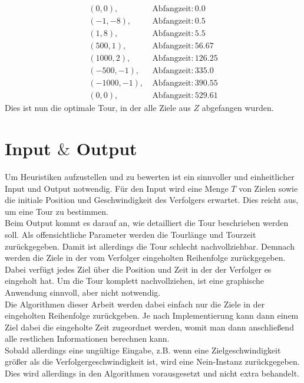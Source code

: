 \documentclass[german,version-2019-11]{uzl-thesis}
\begin{document}
\begin{example}
\begin{align*}
(0, 0),~ &\text{Abfangzeit}: 0.0 \\
(-1, -8),~ &\text{Abfangzeit}: 0.5 \\
(1, 8),~ &\text{Abfangzeit}: 5.5 \\
(500, 1),~ &\text{Abfangzeit}: 56.67 \\
(1000, 2),~ &\text{Abfangzeit}: 126.25 \\
(-500, -1),~ &\text{Abfangzeit}: 335.0 \\
(-1000, -1),~ &\text{Abfangzeit}: 390.55 \\
(0, 0),~ &\text{Abfangzeit}: 529.61
\end{align*}
Dies ist nun die optimale Tour, in der alle Ziele aus $Z$ abgefangen wurden.

\end{example}

\section{Input $\&$ Output}

Um Heuristiken aufzustellen und zu bewerten ist ein sinnvoller und einheitlicher Input und Output notwendig. Für den Input wird eine Menge $T$ von Zielen sowie die initiale Position und Geschwindigkeit des Verfolgers erwartet. Dies reicht aus, um eine Tour zu bestimmen. \\
Beim Output kommt es darauf an, wie detailliert die Tour beschrieben werden soll. Als offensichtliche Parameter werden die Tourlänge und Tourzeit zurückgegeben. Damit ist allerdings die Tour schlecht nachvollziehbar. Demnach werden die Ziele in der vom Verfolger eingeholten Reihenfolge zurückgegeben. Dabei verfügt jedes Ziel über die Position und Zeit in der der Verfolger es eingeholt hat. Um die Tour komplett nachvollziehen, ist eine graphische Anwendung sinnvoll, aber nicht notwendig. \\
Die Algorithmen dieser Arbeit werden dabei einfach nur die Ziele in der eingeholten Reihenfolge zurückgeben. Je nach Implementierung kann dann einem Ziel dabei die eingeholte Zeit zugeordnet werden, womit man dann anschließend alle restlichen Informationen berechnen kann. \\
Sobald allerdings eine ungültige Eingabe, z.B. wenn eine Zielgeschwindigkeit größer als die Verfolgergeschwindigkeit ist, wird eine \glqq Nein\grqq-Instanz zurückgegeben. Dies wird allerdings in den Algorithmen vorausgesetzt und nicht extra behandelt. 
\end{document}
